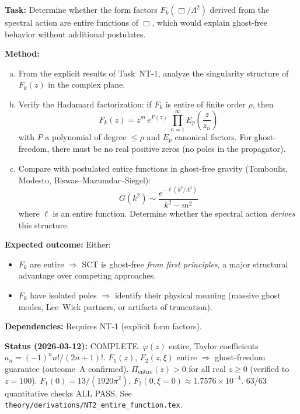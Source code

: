 \documentclass[12pt,a4paper]{article}
\newcommand{\Lam}{\Lambda}
\newcommand{\task}[1]{\noindent\textbf{Task:} #1\par}
\newcommand{\method}[1]{\noindent\textbf{Method:} #1\par}
\newcommand{\outcome}[1]{\noindent\textbf{Expected outcome:} #1\par}
\newcommand{\deps}[1]{\noindent\textbf{Dependencies:} #1\par}
\begin{document}
\task{Determine whether the form factors $F_k(\Box/\Lam^2)$ derived from the
spectral action are entire functions of $\Box$, which would explain ghost-free
behavior without additional postulates.}

\method{
\begin{enumerate}[(a)]
  \item From the explicit results of Task~NT-1, analyze the singularity structure
    of $F_k(z)$ in the complex plane.
  \item Verify the Hadamard factorization: if $F_k$ is entire of finite order $\rho$,
    then
    \begin{equation}\label{eq:hadamard}
      F_k(z) = z^m\, e^{P(z)}\, \prod_{n=1}^\infty
      E_p\!\left(\frac{z}{z_n}\right)
    \end{equation}
    with $P$ a polynomial of degree $\leq \rho$ and $E_p$ canonical factors.
    For ghost-freedom, there must be no real positive zeros (no poles in the propagator).
  \item Compare with postulated entire functions in ghost-free gravity
    (Tomboulis, Modesto, Biswas--Mazumdar--Siegel):
    \begin{equation}\label{eq:ghost-free-prop}
      G(k^2) \sim \frac{e^{-\ell(k^2/\Lam^2)}}{k^2 - m^2}
    \end{equation}
    where $\ell$ is an entire function. Determine whether the spectral action
    \emph{derives} this structure.
\end{enumerate}
}

\outcome{Either:
\begin{itemize}
  \item[(A)] $F_k$ are entire $\Rightarrow$ SCT is ghost-free \emph{from first principles},
    a major structural advantage over competing approaches.
  \item[(B)] $F_k$ have isolated poles $\Rightarrow$ identify their physical meaning
    (massive ghost modes, Lee--Wick partners, or artifacts of truncation).
\end{itemize}
}

\deps{Requires NT-1 (explicit form factors).}

\textbf{Status (2026-03-12):} \textcolor{proven}{COMPLETE.}
$\varphi(z)$ entire, Taylor coefficients $a_n = (-1)^n n!/(2n+1)!$.
$F_1(z)$, $F_2(z,\xi)$ entire $\Rightarrow$ ghost-freedom guarantee (outcome~A confirmed).
$\Pi_{\text{entire}}(z) > 0$ for all real $z \geq 0$ (verified to $z=100$).
$F_1(0) = 13/(1920\pi^2)$, $F_2(0, \xi=0) \approx 1.7576 \times 10^{-4}$.
63/63 quantitative checks ALL PASS.
See \texttt{theory/derivations/NT2\_entire\_function.tex}.
\end{document}
